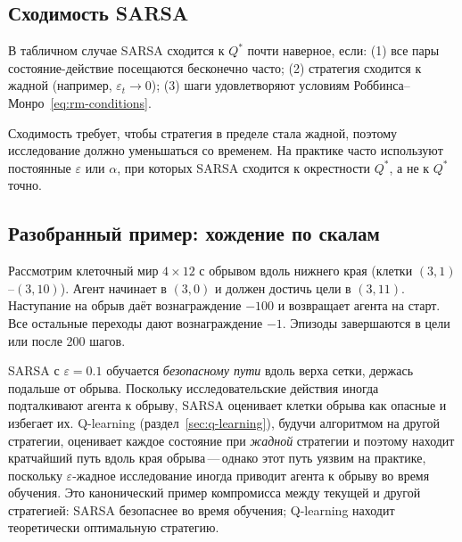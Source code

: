 \subsection{Сходимость SARSA}

\begin{theorem}
В табличном случае SARSA сходится к $Q^*$ почти наверное, если: (1) все пары состояние-действие посещаются бесконечно часто; (2) стратегия сходится к жадной (например, $\varepsilon_t \to 0$); (3) шаги удовлетворяют условиям Роббинса--Монро~\eqref{eq:rm-conditions}.
\end{theorem}

Сходимость требует, чтобы стратегия в пределе стала жадной, поэтому исследование должно уменьшаться со временем.  На практике часто используют постоянные $\varepsilon$ или $\alpha$, при которых SARSA сходится к окрестности $Q^*$, а не к $Q^*$ точно.

\subsection{Разобранный пример: хождение по скалам}

\begin{example}
\label{ex:cliff-walking}
Рассмотрим клеточный мир $4 \times 12$ с обрывом вдоль нижнего края (клетки $(3,1)$--$(3,10)$).  Агент начинает в $(3,0)$ и должен достичь цели в $(3,11)$.  Наступание на обрыв даёт вознаграждение $-100$ и возвращает агента на старт.  Все остальные переходы дают вознаграждение $-1$.  Эпизоды завершаются в цели или после 200 шагов.

SARSA с $\varepsilon=0.1$ обучается \emph{безопасному пути} вдоль верха сетки, держась подальше от обрыва.  Поскольку исследовательские действия иногда подталкивают агента к обрыву, SARSA оценивает клетки обрыва как опасные и избегает их.  Q-learning (раздел~\ref{sec:q-learning}), будучи алгоритмом на другой стратегии, оценивает каждое состояние при \emph{жадной} стратегии и поэтому находит кратчайший путь вдоль края обрыва\,---\,однако этот путь уязвим на практике, поскольку $\varepsilon$-жадное исследование иногда приводит агента к обрыву во время обучения.  Это канонический пример компромисса между текущей и другой стратегией: SARSA безопаснее во время обучения; Q-learning находит теоретически оптимальную стратегию.
\end{example}


